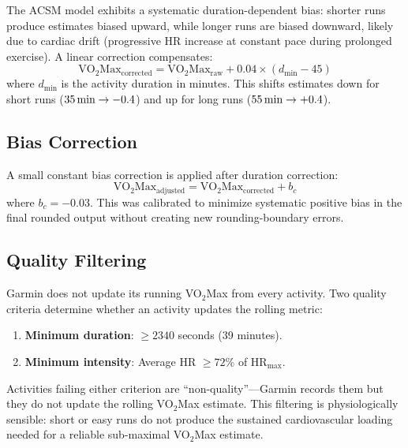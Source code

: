 \documentclass[11pt,a4paper]{article}
\begin{document}
The ACSM model exhibits a systematic duration-dependent bias: shorter runs produce estimates biased upward, while longer runs are biased downward, likely due to cardiac drift (progressive HR increase at constant pace during prolonged exercise).
A linear correction compensates:
\begin{equation}
\text{VO}_2\text{Max}_{\text{corrected}} = \text{VO}_2\text{Max}_{\text{raw}} + 0.04 \times (d_{\text{min}} - 45)
\label{eq:dur-correction}
\end{equation}
where $d_{\text{min}}$ is the activity duration in minutes.
This shifts estimates down for short runs ($35\text{\,min} \to -0.4$) and up for long runs ($55\text{\,min} \to +0.4$).


\subsection{Bias Correction}
\label{sec:bias-correction}

A small constant bias correction is applied after duration correction:
\begin{equation}
\text{VO}_2\text{Max}_{\text{adjusted}} = \text{VO}_2\text{Max}_{\text{corrected}} + b_c
\label{eq:bias-correction}
\end{equation}
where $b_c = -0.03$.
This was calibrated to minimize systematic positive bias in the final rounded output without creating new rounding-boundary errors.


\subsection{Quality Filtering}
\label{sec:quality}

Garmin does not update its running VO$_2$Max from every activity.
Two quality criteria determine whether an activity updates the rolling metric:
\begin{enumerate}[nosep]
    \item \textbf{Minimum duration}: $\geq 2340$ seconds (39 minutes).
    \item \textbf{Minimum intensity}: Average HR $\geq 72\%$ of HR$_{\text{max}}$.
\end{enumerate}

Activities failing either criterion are ``non-quality''---Garmin records them but they do not update the rolling VO$_2$Max estimate.
This filtering is physiologically sensible: short or easy runs do not produce the sustained cardiovascular loading needed for a reliable sub-maximal VO$_2$Max estimate.
\end{document}
